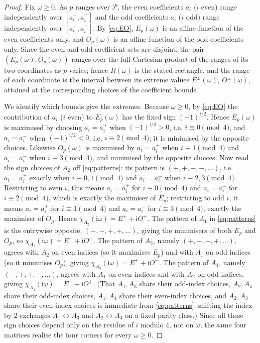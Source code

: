 \documentclass[12pt]{article}
\theoremstyle{definition}
\newcommand{\jj}{\mathrm{i}}
\begin{document}
\begin{proof}
Fix $\omega\ge0$. As $p$ ranges over $\mathcal P$, the even coefficients $a_i$
($i$ even) range independently over $[a_i^-,a_i^+]$ and the odd coefficients $a_i$
($i$ odd) range independently over $[a_i^-,a_i^+]$. By \eqref{eq:EO}, $E_p(\omega)$ is an
affine function of the even coefficients only, and $O_p(\omega)$ is an affine function of
the odd coefficients only. Since the even and odd coefficient sets are disjoint, the pair
$(E_p(\omega),O_p(\omega))$ ranges over the full Cartesian product of the ranges of its
two coordinates as $p$ varies; hence $R(\omega)$ is the stated rectangle, and the range of
each coordinate is the interval between its extreme values $E^\pm(\omega)$,
$O^\pm(\omega)$, attained at the corresponding choices of the coefficient bounds.

We identify which bounds give the extremes. Because $\omega\ge0$, by \eqref{eq:EO} the
contribution of $a_i$ ($i$ even) to $E_p(\omega)$ has the fixed sign $(-1)^{i/2}$. Hence
$E_p(\omega)$ is maximised by choosing $a_i=a_i^+$ when $(-1)^{i/2}>0$, i.e. $i\equiv0
\pmod4$, and $a_i=a_i^-$ when $(-1)^{i/2}<0$, i.e. $i\equiv2\pmod4$; it is minimised by
the opposite choices. Likewise $O_p(\omega)$ is maximised by $a_i=a_i^+$ when
$i\equiv1\pmod4$ and $a_i=a_i^-$ when $i\equiv3\pmod4$, and minimised by the opposite
choices. Now read the sign choices of $A_2$ off \eqref{eq:patterns}: its pattern is
$(+,+,-,-,\dots)$, i.e. $a_i=a_i^+$ exactly when $i\equiv0,1\pmod4$ and $a_i=a_i^-$ when
$i\equiv2,3\pmod4$. Restricting to even $i$, this means $a_i=a_i^+$ for $i\equiv0\pmod4$
and $a_i=a_i^-$ for $i\equiv2\pmod4$, which is exactly the maximiser of $E_p$; restricting
to odd $i$, it means $a_i=a_i^+$ for $i\equiv1\pmod4$ and $a_i=a_i^-$ for $i\equiv3\pmod4$,
exactly the maximiser of $O_p$. Hence $\chi_{A_2}(\jj\omega)=E^++\jj O^+$. The pattern of
$A_1$ in \eqref{eq:patterns} is the entrywise opposite, $(-,-,+,+,\dots)$, giving the
minimisers of both $E_p$ and $O_p$, so $\chi_{A_1}(\jj\omega)=E^-+\jj O^-$. The pattern of
$A_3$, namely $(+,-,-,+,\dots)$, agrees with $A_2$ on even indices (so it maximises $E_p$)
and with $A_1$ on odd indices (so it minimises $O_p$), giving
$\chi_{A_3}(\jj\omega)=E^++\jj O^-$. The pattern of $A_4$, namely $(-,+,+,-,\dots)$, agrees
with $A_1$ on even indices and with $A_2$ on odd indices, giving
$\chi_{A_4}(\jj\omega)=E^-+\jj O^+$. (That $A_1,A_3$ share their odd-index choices, $A_2,A_4$
share their odd-index choices, $A_1,A_4$ share their even-index choices, and $A_2,A_3$ share
their even-index choices is immediate from \eqref{eq:patterns}: shifting the index by $2$
exchanges $A_1\leftrightarrow A_3$ and $A_2\leftrightarrow A_4$ on a fixed parity class.)
Since all these sign choices depend only on the residue of $i$ modulo $4$, not on $\omega$,
the same four matrices realise the four corners for every $\omega\ge0$.
\end{proof}
\end{document}
